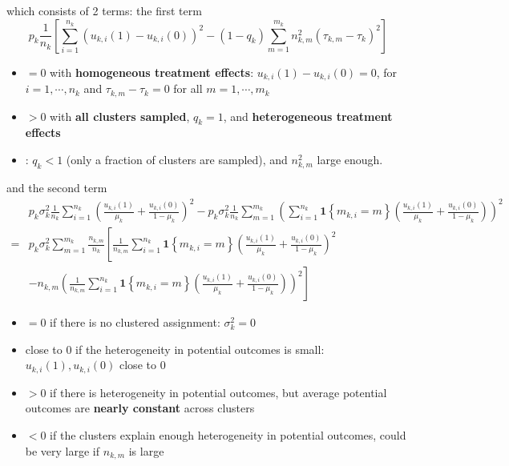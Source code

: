 \documentclass[twoside]{article}
\begin{document}
which consists of 2 terms: the first term
$$p_k\frac{1}{n_k}\left[ \sum^{n_k}_{i=1}\left(u_{k,i}(1)-u_{k,i}(0)\right)^2 - \left(1-q_k\right)\sum^{m_k}_{m=1}n^2_{k,m}\left(\tau_{k,m}-\tau_k\right)^2 \right]$$
\begin{itemize}
    \item $=0$ with \textbf{homogeneous treatment effects}: $u_{k,i}(1)-u_{k,i}(0)=0$, for $i=1,\cdots,n_k$ and $\tau_{k,m}-\tau_k=0$ for all $m=1,\cdots,m_k$
    \item $>0$ with \textbf{all clusters sampled}, $q_k=1$, and \textbf{heterogeneous treatment effects}
    \item {}: $q_k<1$ (only a fraction of clusters are sampled), and $n^2_{k,m}$ large enough.
\end{itemize}
and the second term
\begin{align*}
    &p_k\sigma^2_k \frac{1}{n_k} \sum^{n_k}_{i=1} \left( \frac{u_{k,i}(1)}{\mu_k} + \frac{u_{k,i}(0)}{1-\mu_k} \right)^2 - p_k\sigma^2_k \frac{1}{n_k}\sum^{m_k}_{m=1} \left(\sum^{n_k}_{i=1} \mathbf{1}\left\{m_{k,i}=m\right\} \left(\frac{u_{k,i}(1)}{\mu_k} + \frac{u_{k,i}(0)}{1-\mu_k}\right)\right)^2 \\
    =& p_k\sigma^2_k\sum^{m_k}_{m=1} \frac{n_{k,m}}{n_k} \left[ \frac{1}{n_{k,m}}\sum^{n_k}_{i=1}\mathbf{1}\left\{m_{k,i}=m\right\} \left(\frac{u_{k,i}(1)}{\mu_k} + \frac{u_{k,i}(0)}{1-\mu_k}\right)^2 \right. \\
    & - \left. n_{k,m} \left( \frac{1}{n_{k,m}}\sum^{n_k}_{i=1} \mathbf{1}\left\{m_{k,i}=m\right\} \left(\frac{u_{k,i}(1)}{\mu_k} + \frac{u_{k,i}(0)}{1-\mu_k}\right)\right)^2 \right]
\end{align*}
\begin{itemize}
    \item $=0$ if there is no clustered assignment: $\sigma^2_k=0$
    \item close to $0$ if the heterogeneity in potential outcomes is small: $u_{k,i}(1),u_{k,i}(0)$ close to $0$
    \item $>0$ if there is heterogeneity in potential outcomes, but average potential outcomes are \textbf{nearly constant} across clusters
    \item $<0$ if the clusters explain enough heterogeneity in potential outcomes, could be very large if $n_{k,m}$ is large
\end{itemize}
\end{document}

